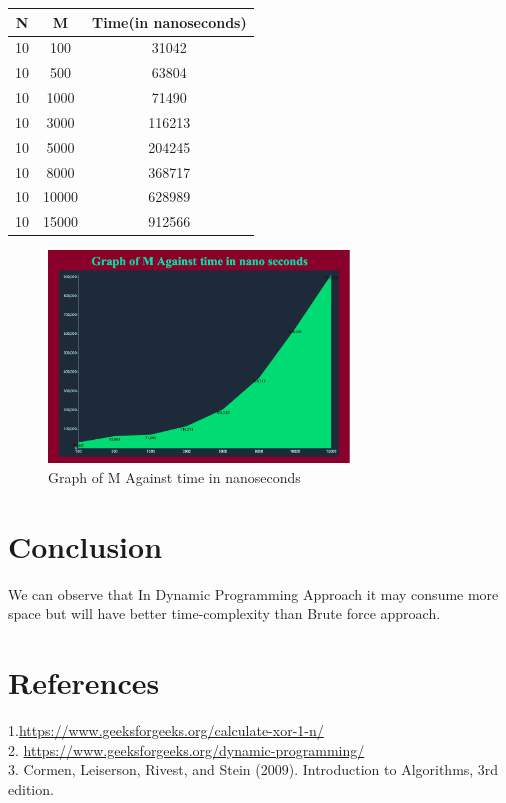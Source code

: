\documentclass[conference]{IEEEtran}
\begin{document}
\begin{center}
 \begin{tabular}{||c| c| c||} 
 \hline
 N & M & Time(in nanoseconds) \\ [0.5ex] 
 \hline\hline
 10 & 100 & 31042  \\ 
 \hline
 10 & 500 & 63804  \\ 
 \hline
 10 & 1000 & 71490  \\ 
 \hline
 10 & 3000 & 116213  \\ 
 \hline
  10 & 5000 & 204245  \\ 
 \hline
  10 & 8000 & 368717  \\ 
 \hline
  10 & 10000 & 628989  \\ 
 \hline
  10 & 15000 & 912566  \\  [1ex] 
 \hline
\end{tabular}
\end{center}
\begin{figure}[h]
\caption{Graph of M Against time in nanoseconds\\}
\centering
\includegraphics[width=8cm]{images/graphm.png}
\end{figure}

\section{Conclusion}
We can observe that In Dynamic Programming Approach it may consume more space but will have better time-complexity than Brute force approach.

 \section{References}
\color{blue}1.{\url{https://www.geeksforgeeks.org/calculate-xor-1-n/} }\\
2. {\url{https://www.geeksforgeeks.org/dynamic-programming/}}\\
3. Cormen, Leiserson, Rivest, and Stein (2009). Introduction to Algorithms, 3rd edition.
\end{document}

